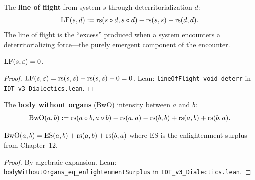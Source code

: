\begin{definition}
\label{def:line-of-flight}
The \textbf{line of flight} from system $s$ through deterritorialization $d$:
\[
\mathrm{LF}(s, d) := \mathrm{rs}(s \circ d, s \circ d) - \mathrm{rs}(s, s) - \mathrm{rs}(d, d).
\]
The line of flight is the ``excess'' produced when a system encounters a
deterritorializing force---the purely emergent component of the encounter.
\end{definition}

\begin{theorem}
\label{thm:lf-void}
$\mathrm{LF}(s, \varepsilon) = 0$.
\end{theorem}

\begin{proof}
$\mathrm{LF}(s, \varepsilon) = \mathrm{rs}(s, s) - \mathrm{rs}(s, s) - 0 = 0$.
Lean: \texttt{lineOfFlight\_void\_deterr} in
\texttt{IDT\_v3\_Dialectics.lean}.
\end{proof}

\begin{definition}
\label{def:bwo}
The \textbf{body without organs} (BwO) intensity between $a$ and $b$:
\[
\mathrm{BwO}(a, b) := \mathrm{rs}(a \circ b, a \circ b) - \mathrm{rs}(a, a) - \mathrm{rs}(b, b)
+ \mathrm{rs}(a, b) + \mathrm{rs}(b, a).
\]
\end{definition}

\begin{theorem}
\label{thm:bwo-enlightenment}
$\mathrm{BwO}(a, b) = \mathrm{ES}(a, b) + \mathrm{rs}(a, b) + \mathrm{rs}(b, a)$ where
$\mathrm{ES}$ is the enlightenment surplus from Chapter~12.
\end{theorem}

\begin{proof}
By algebraic expansion.
Lean: \texttt{bodyWithoutOrgans\_eq\_enlightenmentSurplus} in
\texttt{IDT\_v3\_Dialectics.lean}.
\end{proof}

